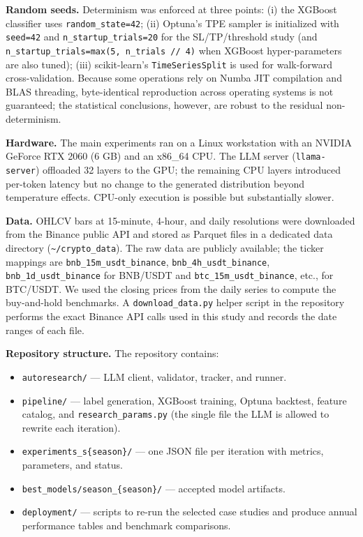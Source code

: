 \documentclass[11pt,a4paper]{article}
\providecommand{\tightlist}{\setlength{\itemsep}{0pt}\setlength{\parskip}{0pt}}
\begin{document}
\textbf{Random seeds.} Determinism was enforced at three points: (i) the XGBoost classifier uses \texttt{random\_state=42}; (ii) Optuna's TPE sampler is initialized with \texttt{seed=42} and \texttt{n\_startup\_trials=20} for the SL/TP/threshold study (and \texttt{n\_startup\_trials=max(5,\ n\_trials\ //\ 4)} when XGBoost hyper-parameters are also tuned); (iii) scikit-learn's \texttt{TimeSeriesSplit} is used for walk-forward cross-validation. Because some operations rely on Numba JIT compilation and BLAS threading, byte-identical reproduction across operating systems is not guaranteed; the statistical conclusions, however, are robust to the residual non-determinism.

\textbf{Hardware.} The main experiments ran on a Linux workstation with an NVIDIA GeForce RTX 2060 (6 GB) and an x86\_64 CPU. The LLM server (\texttt{llama-server}) offloaded 32 layers to the GPU; the remaining CPU layers introduced per-token latency but no change to the generated distribution beyond temperature effects. CPU-only execution is possible but substantially slower.

\textbf{Data.} OHLCV bars at 15-minute, 4-hour, and daily resolutions were downloaded from the Binance public API and stored as Parquet files in a dedicated data directory (\texttt{\textasciitilde{}/crypto\_data}). The raw data are publicly available; the ticker mappings are \texttt{bnb\_15m\_usdt\_binance}, \texttt{bnb\_4h\_usdt\_binance}, \texttt{bnb\_1d\_usdt\_binance} for BNB/USDT and \texttt{btc\_15m\_usdt\_binance}, etc., for BTC/USDT. We used the closing prices from the daily series to compute the buy-and-hold benchmarks. A \texttt{download\_data.py} helper script in the repository performs the exact Binance API calls used in this study and records the date ranges of each file.

\textbf{Repository structure.} The repository contains:

\begin{itemize}
\tightlist
\item
  \texttt{autoresearch/} --- LLM client, validator, tracker, and runner.
\item
  \texttt{pipeline/} --- label generation, XGBoost training, Optuna backtest, feature catalog, and \texttt{research\_params.py} (the single file the LLM is allowed to rewrite each iteration).
\item
  \texttt{experiments\_s\{season\}/} --- one JSON file per iteration with metrics, parameters, and status.
\item
  \texttt{best\_models/season\_\{season\}/} --- accepted model artifacts.
\item
  \texttt{deployment/} --- scripts to re-run the selected case studies and produce annual performance tables and benchmark comparisons.
\end{itemize}
\end{document}
